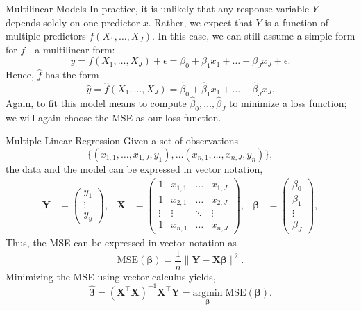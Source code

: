 \documentclass[12pt,t]{beamer}
\begin{document}
\begin{frame}{Multilinear Models} 
\vskip-0.4cm
In practice, it is unlikely that any response variable $Y$ depends solely on one predictor $x$. Rather, we expect that $Y$ is a function of multiple predictors $f(X_1, \ldots, X_J)$. 
\vskip0.2cm
In this case, we can still assume a simple form for $f$ - a multilinear form:
\[
y = f(X_1, \ldots, X_J) + \epsilon = \beta_0 + \beta_1 x_1 + \ldots + \beta_J x_J + \epsilon.
\]
Hence, $\widehat{f}$ has the form
\[
\widehat{y} = \widehat{f}(X_1, \ldots, X_J)  =  \widehat{\beta}_0 + \widehat{\beta}_1 x_1 + \ldots + \widehat{\beta}_J x_J.
\]
Again, to fit this model means to compute $\widehat{\beta}_0, \ldots, \widehat{\beta}_J$ to minimize a loss function; we will again choose the MSE as our loss function.
\end{frame}

\begin{frame}{Multiple Linear Regression} \small
\vskip-0.4cm
Given a set of observations
\[ 
\{(x_{1, 1}, \ldots, x_{1, J}, y_1), \ldots (x_{n, 1}, \ldots, x_{n, J}, y_n)\}, 
\]
the data and the model can be expressed in vector notation,
\begin{align*}
\mathbf{Y} &= \left( \begin{array}{c}
y_1\\
\vdots\\
y_y
\end{array} \right),& \mathbf{X} &= \left( \begin{array}{cccc}
1 & x_{1, 1} & \ldots & x_{1, J}\\
1 & x_{2, 1} & \ldots & x_{2, J}\\
\vdots & \vdots & \ddots & \vdots\\
1 & x_{n, 1} & \ldots & x_{n, J}
\end{array} \right), & \pmb{\beta} &=  \left( \begin{array}{c}
\beta_0\\
\beta_1\\
\vdots\\
\beta_J
\end{array} \right),
\end{align*}
Thus, the MSE can be expressed in vector notation as
\[
\mathrm{MSE}(\pmb{\beta}) = \frac{1}{n}\|\boldsymbol{Y - X\beta}\|^2.
\]
Minimizing the MSE using vector calculus yields,
\[
\widehat{\pmb{\beta}} = \left( \mathbf{X}^\top  \mathbf{X} \right)^{-1} \mathbf{X}^\top  \mathbf{Y} = \underset{\pmb{\beta}}{\mathrm{argmin}}\; \mathrm{MSE}(\pmb{\beta}).
\]
\end{frame}
\end{document}
